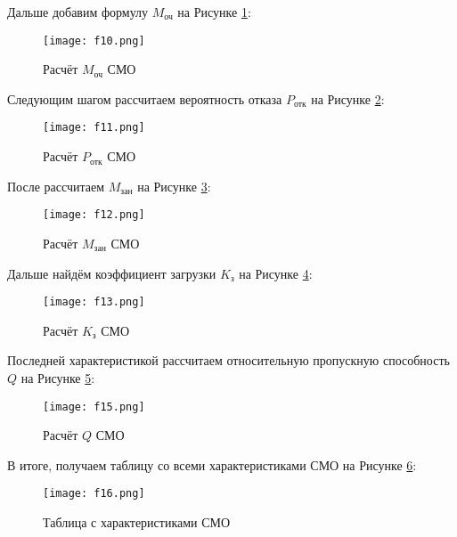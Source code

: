 \documentclass[14pt]{extarticle}
\begin{document}
    Дальше добавим формулу $M_\text{оч}$ на Рисунке \ref{fig:p_m_q}:
    \begin{figure}[!ht]
        \centering
        \texttt{[image: f10.png]}
        \caption{Расчёт $M_\text{оч}$ СМО}
        \label{fig:p_m_q}
    \end{figure}

    \newpage

    Следующим шагом рассчитаем вероятность отказа $P_\text{отк}$ на Рисунке \ref{fig:p_c}:
    \begin{figure}[!ht]
        \centering
        \texttt{[image: f11.png]}
        \caption{Расчёт $P_\text{отк}$ СМО}
        \label{fig:p_c}
    \end{figure}

    После рассчитаем $M_\text{зан}$ на Рисунке \ref{fig:m_b}:
    \begin{figure}[!ht]
        \centering
        \texttt{[image: f12.png]}
        \caption{Расчёт $M_\text{зан}$ СМО}
        \label{fig:m_b}
    \end{figure}

    Дальше найдём коэффициент загрузки $K_\text{з}$ на Рисунке \ref{fig:k_b}:
    \begin{figure}[!ht]
        \centering
        \texttt{[image: f13.png]}
        \caption{Расчёт $K_\text{з}$ СМО}
        \label{fig:k_b}
    \end{figure}

    \newpage

    Последней характеристикой рассчитаем относительную пропускную способность $Q$ на Рисунке \ref{fig:q}:
    \begin{figure}[!ht]
        \centering
        \texttt{[image: f15.png]}
        \caption{Расчёт $Q$ СМО}
        \label{fig:q}
    \end{figure}

    В итоге, получаем таблицу со всеми характеристиками СМО на Рисунке \ref{fig:all-chars}:
    \begin{figure}[!ht]
        \centering
        \texttt{[image: f16.png]}
        \caption{Таблица с характеристиками СМО}
        \label{fig:all-chars}
    \end{figure}
\end{document}
